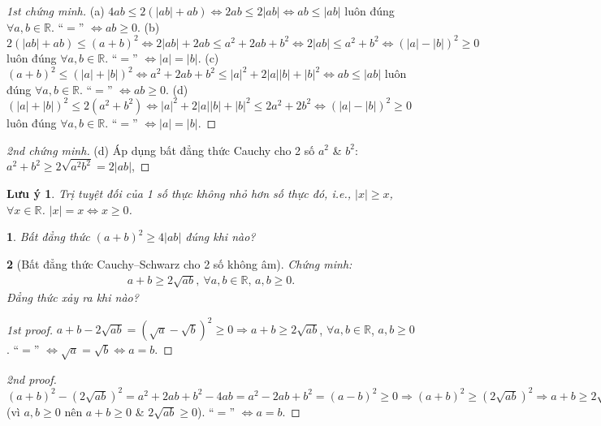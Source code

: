 \documentclass{article}
\newtheorem{baitoan}{}
\newtheorem{luuy}{Lưu ý}
\begin{document}
\begin{proof}[1st chứng minh]
	(a) $4ab\le2(|ab| + ab)\Leftrightarrow2ab\le2|ab|\Leftrightarrow ab\le|ab|$ luôn đúng $\forall a,b\in\mathbb{R}$. ``$=$'' $\Leftrightarrow ab\ge0$. (b) $2(|ab| + ab)\le(a + b)^2\Leftrightarrow2|ab| + 2ab\le a^2 + 2ab + b^2\Leftrightarrow2|ab|\le a^2 + b^2\Leftrightarrow(|a| - |b|)^2\ge0$ luôn đúng $\forall a,b\in\mathbb{R}$. ``$=$'' $\Leftrightarrow|a| = |b|$. (c) $(a + b)^2\le(|a| + |b|)^2\Leftrightarrow a^2 + 2ab + b^2\le|a|^2 + 2|a||b| + |b|^2\Leftrightarrow ab\le|ab|$ luôn đúng $\forall a,b\in\mathbb{R}$. ``$=$'' $\Leftrightarrow ab\ge0$. (d) $(|a| + |b|)^2\le2(a^2 + b^2)\Leftrightarrow|a|^2 + 2|a||b| + |b|^2\le2a^2 + 2b^2\Leftrightarrow(|a| - |b|)^2\ge0$ luôn đúng $\forall a,b\in\mathbb{R}$. ``$=$'' $\Leftrightarrow|a| = |b|$.
\end{proof}

\begin{proof}[2nd chứng minh]
	(d) Áp dụng bất đẳng thức Cauchy cho 2 số $a^2$ \& $b^2$: $a^2 + b^2\ge2\sqrt{a^2b^2} = 2|ab|$, 
\end{proof}

\begin{luuy}
	Trị tuyệt đối của 1 số thực không nhỏ hơn số thực đó, i.e., $|x|\ge x$, $\forall x\in\mathbb{R}$. $|x| = x\Leftrightarrow x\ge0$.
\end{luuy}

\begin{baitoan}
	Bất đẳng thức $(a + b)^2\ge4|ab|$ đúng khi nào?
\end{baitoan}

\begin{baitoan}[Bất đẳng thức Cauchy--Schwarz cho 2 số không âm]
	Chứng minh:
	\begin{align*}
		\boxed{a + b\ge2\sqrt{ab},\ \forall a,b\in\mathbb{R},\,a,b\ge 0.}
	\end{align*}
	Đẳng thức xảy ra khi nào?
\end{baitoan}

\begin{proof}[1st proof]
	$a + b - 2\sqrt{ab} = (\sqrt{a} - \sqrt{b})^2\ge0\Rightarrow a + b\ge2\sqrt{ab}$, $\forall a,b\in\mathbb{R}$, $a,b\ge 0$. ``$=$'' $\Leftrightarrow\sqrt{a} = \sqrt{b}\Leftrightarrow a = b$.
\end{proof}

\begin{proof}[2nd proof]
	$(a + b)^2 - (2\sqrt{ab})^2 = a^2 + 2ab + b^2 - 4ab = a^2 - 2ab + b^2 = (a - b)^2\ge0\Rightarrow(a + b)^2\ge(2\sqrt{ab})^2\Rightarrow a + b\ge2\sqrt{ab}$ (vì $a,b\ge0$ nên $a + b\ge0$ \& $2\sqrt{ab}\ge0$). ``$=$'' $\Leftrightarrow a = b$.
\end{proof}
\end{document}
